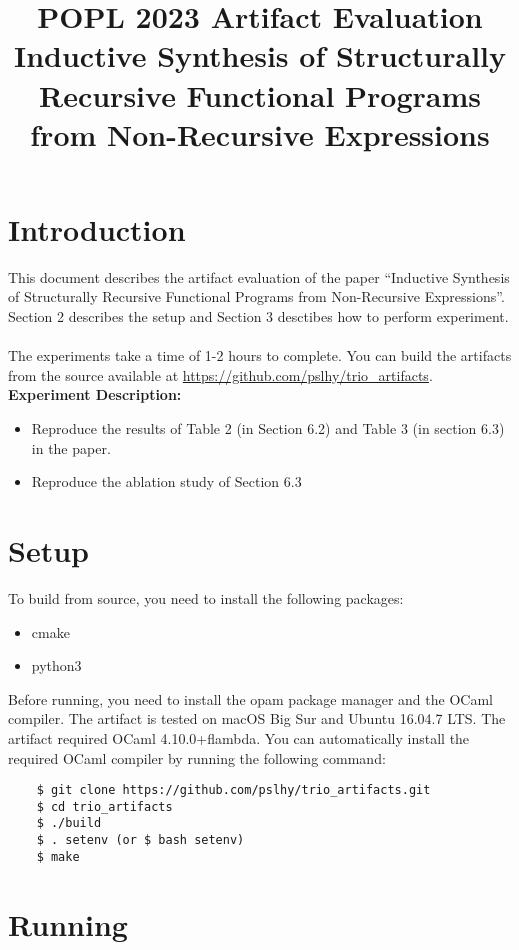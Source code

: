 \documentclass{article}
\title{POPL 2023 Artifact Evaluation\\ Inductive Synthesis of Structurally Recursive Functional Programs from Non-Recursive Expressions}
\date{}
\begin{document}
\setlength\parindent{0pt}
\maketitle
\section{Introduction}
This document describes the artifact evaluation of the paper ``Inductive Synthesis of Structurally Recursive Functional Programs from Non-Recursive Expressions''. Section 2 describes the setup and Section 3 desctibes how to perform experiment.
\\
\\ The experiments take a time of 1-2 hours to complete. You can build the artifacts from the source available at \url{https://github.com/pslhy/trio_artifacts}.
\\

\textbf{Experiment Description:}
\begin{itemize}
    \item Reproduce the results of Table 2 (in Section 6.2) and Table 3 (in section 6.3) in the paper.
    \item Reproduce the ablation study of Section 6.3
\end{itemize}

\section{Setup}
To build from source, you need to install the following packages:
\begin{itemize}
    \item cmake
    \item python3
\end{itemize}
Before running, you need to install the opam package manager and the OCaml compiler. The artifact is tested on macOS Big Sur and Ubuntu 16.04.7 LTS. The artifact required OCaml 4.10.0+flambda. You can automatically install the required OCaml compiler by running the following command:

\begin{lstlisting}
    $ git clone https://github.com/pslhy/trio_artifacts.git
    $ cd trio_artifacts
    $ ./build
    $ . setenv (or $ bash setenv)
    $ make
\end{lstlisting}

\section{Running}
\end{document}
